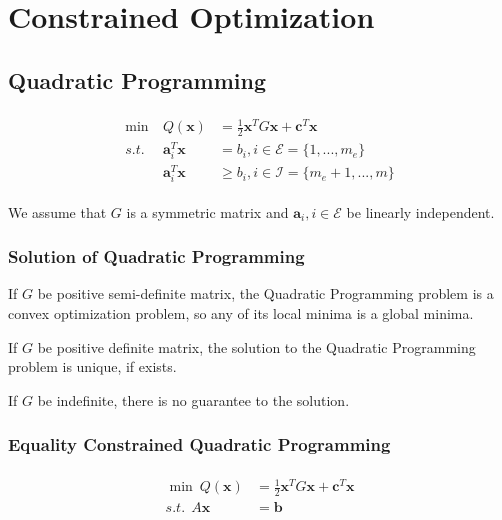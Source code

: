 \chapter{Constrained Optimization}
\vspace{1em}
\section{Quadratic Programming}

\begin{align}
    \begin{array}{lll}
        \min \ &Q(\mathbf{x}) &= \frac{1}{2}\mathbf{x}^T G\mathbf{x} + \mathbf{c}^T \mathbf{x} \\
        s.t. \ \ &\mathbf{a}_i^T \mathbf{x} &= b_i, i \in \mathcal{E} = \{1,...,m_e \} \\
        &\mathbf{a}_i^T \mathbf{x} &\geq b_i, i \in \mathcal{I} = \{m_e+1,...,m \}
    \end{array}
\end{align}

We assume that $G$ is a symmetric matrix and $\mathbf{a}_i, i \in \mathcal{E}$
be linearly independent.

\par
\subsection{Solution of Quadratic Programming}
\par
If $G$ be positive semi-definite matrix, the 
Quadratic Programming problem is a convex optimization
problem, so any of its local minima is a global minima.
\par
If $G$ be positive definite matrix, the
solution to the Quadratic Programming problem
is unique, if exists.
\par
If $G$ be indefinite, there is no guarantee to the solution.

\par
\subsection{Equality Constrained Quadratic Programming}
\begin{align}
    \begin{array}{ll}
        \min \ Q(\mathbf{x}) &= \frac{1}{2}\mathbf{x}^T G\mathbf{x} + \mathbf{c}^T \mathbf{x} \\
        s.t. \ \ A \mathbf{x} &= \mathbf{b}
    \end{array}
\end{align}

